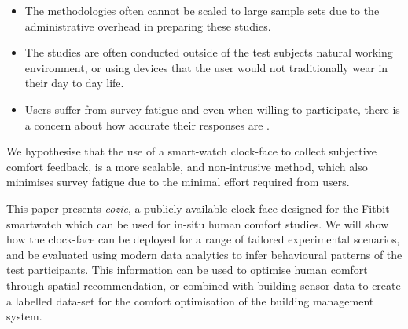 








\begin{itemize}
  \item The methodologies often cannot be scaled to large sample sets due to the administrative overhead in preparing these studies.
  \item The studies are often conducted outside of the test subjects natural working environment, or using devices that the user would not traditionally wear in their day to day life. 
  \item Users suffer from survey fatigue \cite{porter2004multiple} and even when willing to participate, there is a concern about how accurate their responses are \cite{Clear2018}.
\end{itemize}

We hypothesise that the use of a smart-watch clock-face to collect subjective comfort feedback, is a more scalable, and non-intrusive method, which also minimises survey fatigue due to the minimal effort required from users. 

This paper presents \emph{cozie}, a publicly available clock-face designed for the Fitbit smartwatch which can be used for in-situ human comfort studies. We will show how the clock-face can be deployed for a range of tailored experimental scenarios, and be evaluated using modern data analytics to infer behavioural patterns of the test participants. This information can be used to optimise human comfort through spatial recommendation, or combined with building sensor data to create a labelled data-set for the comfort optimisation of the building management system. 


